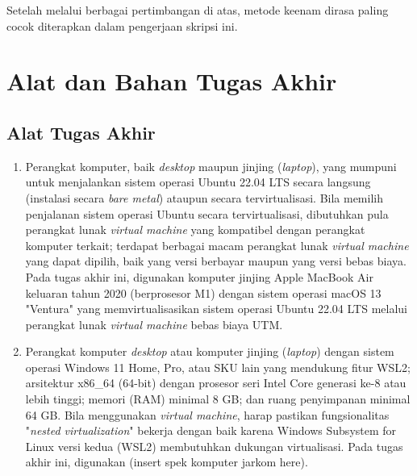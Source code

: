 Setelah melalui berbagai pertimbangan di atas, metode keenam dirasa paling cocok diterapkan dalam pengerjaan skripsi ini.

\section{Alat dan Bahan Tugas Akhir}

\subsection{Alat Tugas Akhir}

\begin{enumerate}
    \item Perangkat komputer, baik \textit{desktop} maupun jinjing (\textit{laptop}), yang mumpuni untuk menjalankan sistem operasi Ubuntu 22.04 LTS secara langsung (instalasi secara \textit{bare metal}) ataupun secara tervirtualisasi. Bila memilih penjalanan sistem operasi Ubuntu secara tervirtualisasi, dibutuhkan pula perangkat lunak \textit{virtual machine} yang kompatibel dengan perangkat komputer terkait; terdapat berbagai macam perangkat lunak \textit{virtual machine} yang dapat dipilih, baik yang versi berbayar maupun yang versi bebas biaya. Pada tugas akhir ini, digunakan komputer jinjing Apple MacBook Air keluaran tahun 2020 (berprosesor M1) dengan sistem operasi macOS 13 "Ventura" yang memvirtualisasikan sistem operasi Ubuntu 22.04 LTS melalui perangkat lunak \textit{virtual machine} bebas biaya UTM.
    \item Perangkat komputer \textit{desktop} atau komputer jinjing (\textit{laptop}) dengan sistem operasi Windows 11 Home, Pro, atau SKU lain yang mendukung fitur WSL2; arsitektur x86\_64 (64-bit) dengan prosesor seri Intel Core generasi ke-8 atau lebih tinggi; memori (RAM) minimal 8 GB; dan ruang penyimpanan minimal 64 GB. Bila menggunakan \textit{virtual machine}, harap pastikan fungsionalitas "\textit{nested virtualization}" bekerja dengan baik karena Windows Subsystem for Linux versi kedua (WSL2) membutuhkan dukungan virtualisasi. Pada tugas akhir ini, digunakan (insert spek komputer jarkom here).

\end{enumerate}
